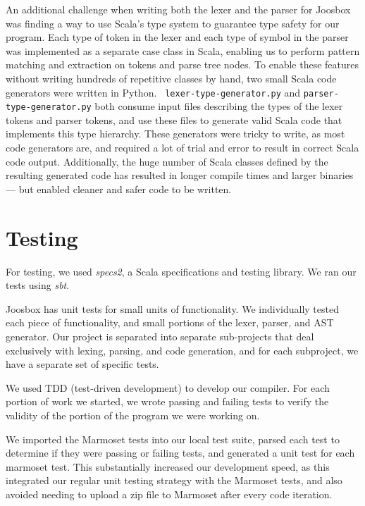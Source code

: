 \documentclass[letterpaper]{article}
\begin{document}
  An additional challenge when writing both the lexer and the parser for Joosbox
  was finding a way to use Scala's type system to guarantee type safety for our
  program. Each type of token in the lexer and each type of symbol in the parser
  was implemented as a separate case class in Scala, enabling us to perform
  pattern matching and extraction on tokens and parse tree nodes. To enable
  these features without writing hundreds of repetitive classes by hand, two
  small Scala code generators were written in Python.  {\tt
  lexer-type-generator.py} and {\tt parser-type-generator.py} both consume input
  files describing the types of the lexer tokens and parser tokens, and use
  these files to generate valid Scala code that implements this type hierarchy.
  These generators were tricky to write, as most code generators are, and
  required a lot of trial and error to result in correct Scala code output.
  Additionally, the huge number of Scala classes defined by the resulting
  generated code has resulted in longer compile times and larger binaries ---
  but enabled cleaner and safer code to be written.

  \section{Testing}

  For testing, we used {\em specs2}, a Scala specifications and testing library.
  We ran our tests using {\em sbt}.

  Joosbox has unit tests for small units of functionality. We individually
  tested each piece of functionality, and small portions of the lexer, parser,
  and AST generator. Our project is separated into separate sub-projects that
  deal exclusively with lexing, parsing, and code generation, and for each
  subproject, we have a separate set of specific tests.

  We used TDD (test-driven development) to develop our compiler. For each
  portion of work we started, we wrote passing and failing tests to verify the
  validity of the portion of the program we were working on.

  We imported the Marmoset tests into our local test suite, parsed each test to
  determine if they were passing or failing tests, and generated a unit test for
  each marmoset test. This substantially increased our development speed, as
  this integrated our regular unit testing strategy with the Marmoset tests, and
  also avoided needing to upload a zip file to Marmoset after every code
  iteration.
\end{document}

